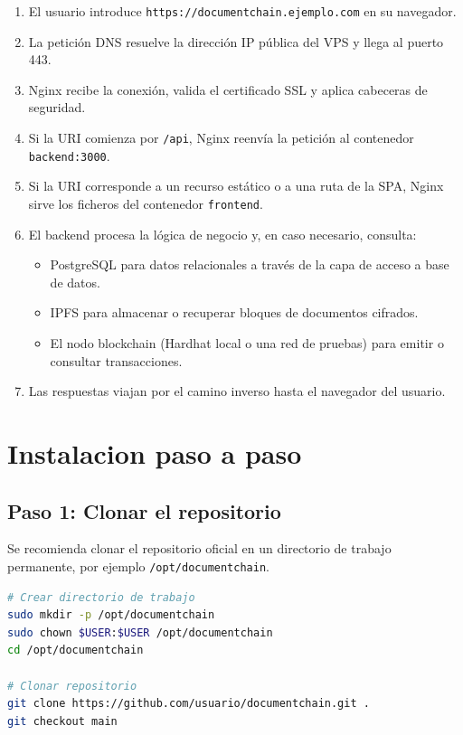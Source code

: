 \documentclass[11pt, a4paper]{article}
\begin{document}
\begin{enumerate}[leftmargin=*]
    \item El usuario introduce \texttt{https://documentchain.ejemplo.com} en su navegador.
    \item La petici\'{o}n DNS resuelve la direcci\'{o}n IP p\'{u}blica del VPS y llega al puerto 443.
    \item Nginx recibe la conexi\'{o}n, valida el certificado SSL y aplica cabeceras de seguridad.
    \item Si la URI comienza por \texttt{/api}, Nginx reenv\'{i}a la petici\'{o}n al contenedor \texttt{backend:3000}.
    \item Si la URI corresponde a un recurso est\'{a}tico o a una ruta de la SPA, Nginx sirve los ficheros del contenedor \texttt{frontend}.
    \item El backend procesa la l\'{o}gica de negocio y, en caso necesario, consulta:
    \begin{itemize}
        \item PostgreSQL para datos relacionales a trav\'{e}s de la capa de acceso a base de datos.
        \item IPFS para almacenar o recuperar bloques de documentos cifrados.
        \item El nodo blockchain (Hardhat local o una red de pruebas) para emitir o consultar transacciones.
    \end{itemize}
    \item Las respuestas viajan por el camino inverso hasta el navegador del usuario.
\end{enumerate}

\section{Instalacion paso a paso}

\subsection{Paso 1: Clonar el repositorio}

Se recomienda clonar el repositorio oficial en un directorio de trabajo permanente, por ejemplo \texttt{/opt/documentchain}.

\begin{lstlisting}[language=bash, caption={Clonaci\'{o}n del c\'{o}digo fuente}]
# Crear directorio de trabajo
sudo mkdir -p /opt/documentchain
sudo chown $USER:$USER /opt/documentchain
cd /opt/documentchain

# Clonar repositorio
git clone https://github.com/usuario/documentchain.git .
git checkout main
\end{lstlisting}
\end{document}

